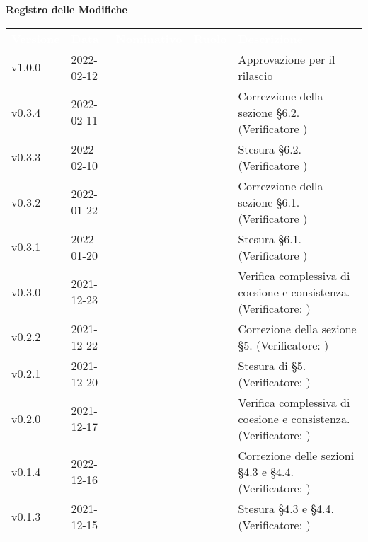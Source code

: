 
{\LARGE{\textbf{Registro delle Modifiche}}} \\
\renewcommand{\arraystretch}{1.5}
\begin{longtable}{ m{}<{\centering}  m{}<{\centering}  m{}<{\centering}  m{}<{\centering}  m{}<{\centering} }
	\rowcolor{darkblue}
	\textcolor{white}{\textbf{Versione}} &\textcolor{white}{\textbf{Data}}& \textcolor{white}{\textbf{Nominativo}} & \textcolor{white}{\textbf{Ruolo}}& \textcolor{white}{\textbf{Descrizione}} \\ 	
	v1.0.0& 2022-02-12 & \GC & \RE{}  & Approvazione per il rilascio\\

	v0.3.4& 2022-02-11 & \EP{} & \AM{} & Correzzione della sezione §6.2. (Verificatore \textit{\MG}) \\

	v0.3.3& 2022-02-10 & \EP{} & \AM{} & Stesura §6.2. (Verificatore \textit{\MG}) \\

	v0.3.2& 2022-01-22 & \EP{} & \AM{} & Correzzione della sezione §6.1. (Verificatore \textit{\MG}) \\

	v0.3.1& 2022-01-20 & \EP{} & \AM{} & Stesura §6.1. (Verificatore \textit{\MG}) \\

	v0.3.0& 2021-12-23 & \EP{} & \AM {} & Verifica complessiva di coesione e consistenza. (Verificatore: \textit{\MG})\\	

	v0.2.2& 2021-12-22 & \EP{} & \AM{} & Correzione della sezione §5. (Verificatore: \textit{\MG})\\
	
	v0.2.1& 2021-12-20 & \EP{} & \AM{} & Stesura di §5. (Verificatore: \textit{\MG})\\

	v0.2.0& 2021-12-17 & \EP{} & \AM{} & Verifica complessiva di coesione e consistenza. (Verificatore: \textit{\MG})\\	
	
	v0.1.4& 2022-12-16 & \MB{} & \AM{} & Correzione delle sezioni §4.3 e §4.4. (Verificatore: \textit{\MG})\\
	
	v0.1.3& 2021-12-15 & \MB{} & \AM{} & Stesura §4.3 e §4.4. (Verificatore: \textit{\MG})\\


\end{longtable}
